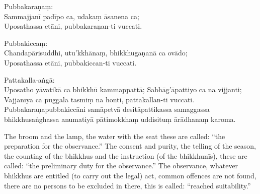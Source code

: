 Pubbakaraṇaṃ:\\
Sammajjanī padīpo ca, udakaṃ āsanena ca;\\
Uposathassa etāni, pubbakaraṇan-ti vuccati.\\

\smallskip

Pubbakiccaṃ:\\
Chandapārisuddhi, utu'kkhānaṃ, bhikkhugaṇanā ca ovādo;\\
Uposathassa etāni, pubbakiccan-ti vuccati.\\

\smallskip

Pattakalla-aṅgā:\\
Uposatho yāvatikā ca bhikkhū kammappattā; Sabhāg'āpattiyo ca na vijjanti;
Vajjanīyā ca puggalā tasmiṃ na honti, pattakallan-ti vuccati.
Pubbakaraṇapubbakiccāni samāpetvā desitāpattikassa samaggassa
bhikkhusaṅghassa anumatiyā pātimokkhaṃ uddisituṃ ārādhanaṃ
karoma.

\bigskip

The broom and the lamp, the water with the seat these are called: “the preparation for the observance.”
The consent and purity, the telling of the season, the counting of the bhikkhus and the instruction (of the bhikkhunīs), these are called: “the preliminary duty for the observance.”
The observance, whatever bhikkhus are entitled (to carry out the legal) act, common offences are not found, there are no persons to be excluded in there, this is called: “reached suitability.”

\clearpage
